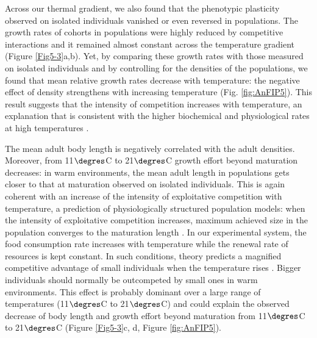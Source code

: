 Across our thermal gradient, we also found that the phenotypic plasticity
observed on isolated individuals vanished or even reversed in populations. The
growth rates of cohorts in populations were highly reduced by competitive
interactions and it remained almost constant across the temperature gradient
(Figure \ref{Fig5-3}a,b). Yet, by comparing these growth rates with those
measured on isolated individuals and by controlling for the densities of the populations, we
found that mean relative growth rates decrease with temperature: the negative
effect of density strengthens with increasing temperature (Fig. \ref{fig:AnFIP5}).
This result suggests that the intensity of competition increases with temperature, an
explanation that is consistent with the higher biochemical and physiological
rates at high temperatures \autocites{gillooly2001a}.

The mean adult body length is negatively correlated with the adult densities.
Moreover, from 11$\degres$C to 21$\degres$C growth effort beyond maturation
decreases:
in warm environments, the mean adult length in populations gets closer to that
at maturation observed on isolated individuals. This is again coherent with an
increase of the intensity of exploitative competition with temperature, a
prediction of physiologically structured population models: when the intensity
of exploitative competition increases, maximum achieved size in the population
converges to the maturation length \autocites{metz1986a,de-roos1997a}. In our
experimental system, the food consumption rate increases with temperature while
the renewal rate of resources is kept constant. In such conditions, theory
predicts a magnified competitive advantage of small individuals when the
temperature rises \autocites{ohlberger2011a}. Bigger individuals should normally
be outcompeted by small ones in warm environments. This effect is probably
dominant over a large range of temperatures (11$\degres$C to 21$\degres$C) and
could explain the observed decrease of body length and growth effort beyond
maturation from 11$\degres$C to 21$\degres$C (Figure \ref{Fig5-3}c, d, Figure
\ref{fig:AnFIP5}).

